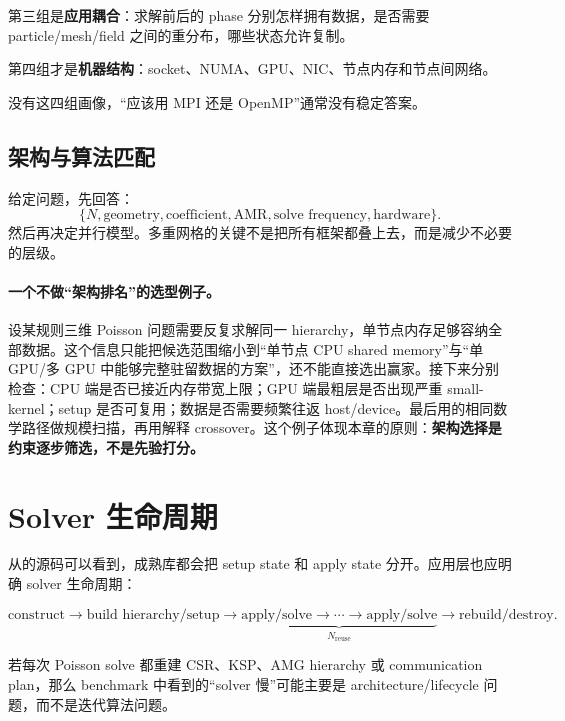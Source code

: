 第三组是\textbf{应用耦合}：求解前后的 phase 分别怎样拥有数据，是否需要 particle/mesh/field 之间的重分布，哪些状态允许复制。

第四组才是\textbf{机器结构}：socket、NUMA、GPU、NIC、节点内存和节点间网络。

没有这四组画像，“应该用 MPI 还是 OpenMP”通常没有稳定答案。


\subsection{架构与算法匹配}

给定问题，先回答：
\begin{equation}
\{N,\text{geometry},\text{coefficient},\text{AMR},\text{solve frequency},\text{hardware}\}.
\end{equation}
然后再决定并行模型。多重网格的关键不是把所有框架都叠上去，而是减少不必要的层级。

\paragraph{一个不做“架构排名”的选型例子。}
设某规则三维 Poisson 问题需要反复求解同一 hierarchy，单节点内存足够容纳全部数据。这个信息只能把候选范围缩小到“单节点 CPU shared memory”与“单 GPU/多 GPU 中能够完整驻留数据的方案”，还不能直接选出赢家。接下来分别检查：CPU 端是否已接近内存带宽上限；GPU 端最粗层是否出现严重 small-kernel；setup 是否可复用；数据是否需要频繁往返 host/device。最后用的相同数学路径做规模扫描，再用解释 crossover。这个例子体现本章的原则：\textbf{架构选择是约束逐步筛选，不是先验打分。}

\section{Solver 生命周期}

从的源码可以看到，成熟库都会把 setup state 和 apply state 分开。应用层也应明确 solver 生命周期：

\begin{equation}
\boxed{
\text{construct}
\rightarrow
\text{build hierarchy/setup}
\rightarrow
\underbrace{\text{apply/solve}\rightarrow\cdots\rightarrow\text{apply/solve}}_{N_{\mathrm{reuse}}}
\rightarrow
\text{rebuild/destroy}.
}
\label{eq:architecture-solver-lifecycle}
\end{equation}

若每次 Poisson solve 都重建 CSR、KSP、AMG hierarchy 或 communication plan，那么 benchmark 中看到的“solver 慢”可能主要是 architecture/lifecycle 问题，而不是迭代算法问题。

